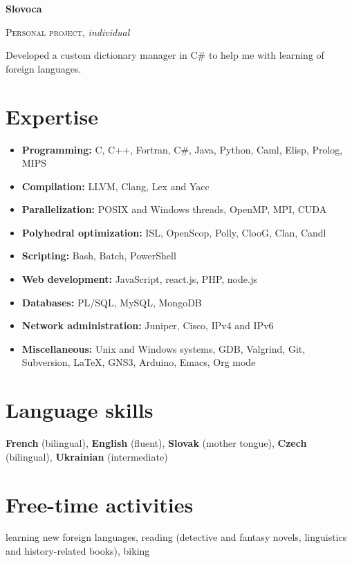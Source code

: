 \documentclass[a4paper, 11pt]{article}
\begin{document}
\textbf{Slovoca}

\textsc{Personal project}, \emph{individual}

Developed a custom dictionary manager in C\# to help me with learning of foreign
languages.

\section*{Expertise}
\label{sec:org7bbe237}

\begin{itemize}
\item \textbf{Programming:} C, C++, Fortran, C\#, Java, Python, Caml, Elisp, Prolog, MIPS
\item \textbf{Compilation:} LLVM, Clang, Lex and Yacc
\item \textbf{Parallelization:} POSIX and Windows threads, OpenMP, MPI, CUDA
\item \textbf{Polyhedral optimization:} ISL, OpenScop, Polly, ClooG, Clan, Candl
\item \textbf{Scripting:} Bash, Batch, PowerShell
\item \textbf{Web development:} JavaScript, react.js, PHP, node.js
\item \textbf{Databases:} PL/SQL, MySQL, MongoDB
\item \textbf{Network administration:} Juniper, Cisco, IPv4 and IPv6
\item \textbf{Miscellaneous:} Unix and Windows systems, GDB, Valgrind, Git, Subversion,
\LaTeX, GNS3, Arduino, Emacs, Org mode
\end{itemize}

\section*{Language skills}
\label{sec:orgdf7fdb1}

\textbf{French} (bilingual), \textbf{English} (fluent), \textbf{Slovak} (mother tongue), \textbf{Czech}
(bilingual), \textbf{Ukra\-ini\-an} (intermediate)

\section*{Free-time activities}
\label{sec:org3c85015}

learning new foreign languages, reading (detective and fantasy novels,
linguistics and history-related books), biking
\end{document}
